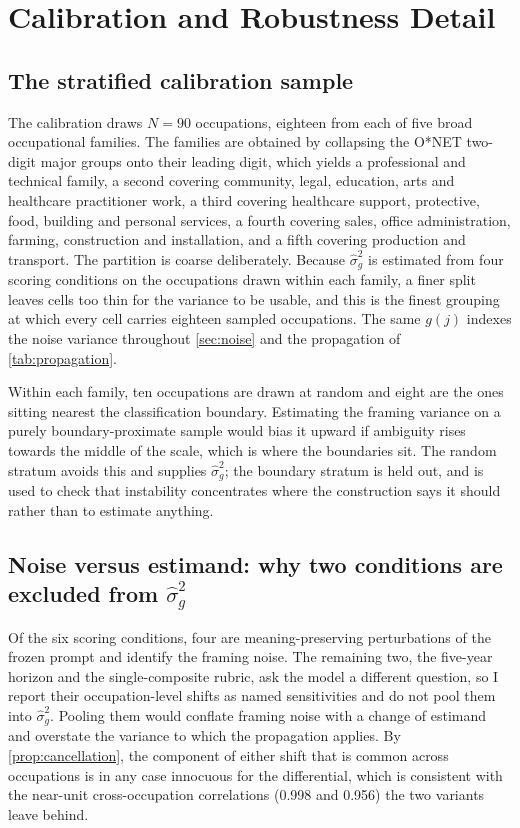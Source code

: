 \section{Calibration and Robustness Detail}\label{app:calibration}

\subsection{The stratified calibration sample}

The calibration draws $N = 90$ occupations, eighteen from each of five broad occupational families. The families are obtained by collapsing the O*NET two-digit major groups onto their leading digit, which yields a professional and technical family, a second covering community, legal, education, arts and healthcare practitioner work, a third covering healthcare support, protective, food, building and personal services, a fourth covering sales, office administration, farming, construction and installation, and a fifth covering production and transport. The partition is coarse deliberately. Because $\widehat{\sigma}^2_g$ is estimated from four scoring conditions on the occupations drawn within each family, a finer split leaves cells too thin for the variance to be usable, and this is the finest grouping at which every cell carries eighteen sampled occupations. The same $g(j)$ indexes the noise variance throughout \cref{sec:noise} and the propagation of \cref{tab:propagation}.

Within each family, ten occupations are drawn at random and eight are the ones sitting nearest the classification boundary. Estimating the framing variance on a purely boundary-proximate sample would bias it upward if ambiguity rises towards the middle of the scale, which is where the boundaries sit. The random stratum avoids this and supplies $\widehat{\sigma}^2_g$; the boundary stratum is held out, and is used to check that instability concentrates where the construction says it should rather than to estimate anything.

\subsection{Noise versus estimand: why two conditions are excluded from \texorpdfstring{$\widehat{\sigma}^2_g$}{the variance}}

Of the six scoring conditions, four are meaning-preserving perturbations of the frozen prompt and identify the framing noise. The remaining two, the five-year horizon and the single-composite rubric, ask the model a different question, so I report their occupation-level shifts as named sensitivities and do not pool them into $\widehat{\sigma}^2_g$. Pooling them would conflate framing noise with a change of estimand and overstate the variance to which the propagation applies. By \cref{prop:cancellation}, the component of either shift that is common across occupations is in any case innocuous for the differential, which is consistent with the near-unit cross-occupation correlations (0.998 and 0.956) the two variants leave behind.

